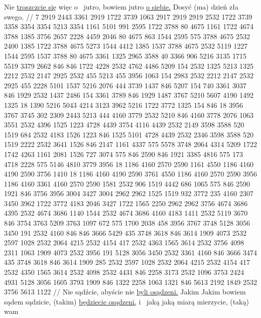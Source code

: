  Nie \underline{troszczcie się} więc o~ jutro, bowiem jutro  \underline{o siebie.} Dosyć (ma) dzień zła swego.
//
\endgl
\begingl
\lettrine[loversize=1,lraise=-1.3]{7 }{}%
 2919 2443 3361 2919
{} 1722 3739 1063 2917 2919 {} 2919 2532 1722 3739 3358 3354 {} 3354 5213 3354
{} 1161 5101 991 2595 1722 3788 80 4675 1161 1722 4674 3788 1385 3756 2657
{} 2228 4459 2046 80 4675 863 1544 2595 575 3788 4675 2532 2400 1385 {} 1722 3788 4675
{} 5273 1544 4412 1385 1537 3788 4675 2532 5119 1227 {} 1544 2595 1537 3788 80 4675
{} 3361 1325 2965 3588 40 3366 906 5216 3135 1715 5519 3379 2662 846 846 1722 4228 2532 4762 {} 4486 5209
{} 154 2532 1325 5213 1325 2212 2532 2147 2925 2532 455 5213 455
{} 3956 1063 154 2983 2532 2212 2147 2532 2925 455
{} 2228 5101 1537 5216 2076 444 3739 1437 846 5207 154 {} 740 3361 3037 846 1929
{} 2532 1437 {} 2486 154 3361 3789 846 1929
{} 1487 3767 5210 5607 4190 1492 1325 18 1390 5216 5043 4214 3123 3962 5216 1722 3772 1325 154 846 {} 18
{} 3956 3767 3745 302 2309 2443 5213 444 4160 3779 2532 5210 846 4160 3778 2076 1063 3551 2532 4396
{} 1525 1223 4728 4439 3754 4116 {} 4439 2532 2149 3598 3588 520 1519 684 2532 4183 1526 {} 1223 846 1525
{} {} 5101 4728 {} 4439 2532 2346 3598 3588 520 1519 2222 2532 3641 1526 {} 846 2147
{} 1161 4337 575 5578 3748 2064 4314 5209 1722 1742 4263 1161 2081 1526 727 3074
{} 575 846 2590 846 1921 3385 4816 575 173 4718 2228 575 5146 4810
{} 3779 3956 18 1186 4160 2570 2590 1161 4550 1186 4160 4190 2590
{} 3756 1410 18 1186 4160 4190 2590 3761 4550 1186 4160 2570 2590
{} 3956 1186 4160 3361 4160 2570 2590 1581 2532 906 1519 4442
{} 686 1065 575 846 2590 1921 846
{} 3756 3956 3004 3427 3004 2962 2962 1525 1519 932 3772 235 4160 2307 3450 3962 1722 3772
{} 4183 2046 3427 1722 1565 2250 2962 2962 3756 {} 4674 3686 4395 2532 4674 3686 1140 1544 2532 4674 3686 4160 4183 1411
{} 2532 5119 3670 846 3754 3763 5209 3763 1097 672 575 1700 2038 458
{} 3956 3767 3748 5128 3056 3450 191 2532 4160 846 846 3666 {} 5429 435 3748 3618 846 3614 1909 4073
{} 2532 2597 1028 2532 2064 4215 2532 4154 417 2532 4363 {} 1565 3614 2532 3756 4098 2311 1063 1909 4073
{} 2532 3956 191 5128 3056 3450 2532 3361 4160 846 3666 {} 3474 435 3748 3618 846 3614 1909 285
{} 2532 2597 1028 2532 2064 4215 2532 4154 417 2532 4350 {} 1565 3614 2532 4098 2532 4431 846 2258 3173
{} 2532 1096 {} 3753 2424 4931 5128 3056 1605 3793 1909 846 1322
{} 2258 1063 1321 846 5613 2192 1849 2532 3756 5613 1122
//
\glb
 Nie sądźcie, abyście nie \underline{byli osądzeni.}
 Jakim Jakim bowiem sądem sądzicie, (takim) \underline{będziecie osądzeni,} i~ jaką jaką miarą mierzycie, (taką)  wam 
